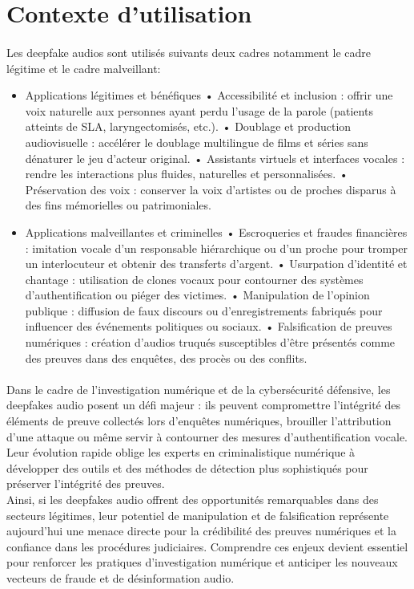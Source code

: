 \documentclass[memoire, 12pt]{report}
\begin{document}
\section{Contexte d’utilisation}

\paragraph{}Les deepfake audios sont utilisés suivants deux cadres notamment le cadre légitime et le cadre malveillant:
\begin{itemize}
    \item Applications légitimes et bénéfiques
	•	Accessibilité et inclusion : offrir une voix naturelle aux personnes ayant perdu l’usage de la parole (patients atteints de SLA, laryngectomisés, etc.).
	•	Doublage et production audiovisuelle : accélérer le doublage multilingue de films et séries sans dénaturer le jeu d’acteur original.
	•	Assistants virtuels et interfaces vocales : rendre les interactions plus fluides, naturelles et personnalisées.
	•	Préservation des voix : conserver la voix d’artistes ou de proches disparus à des fins mémorielles ou patrimoniales.
	\item Applications malveillantes et criminelles
	•	Escroqueries et fraudes financières : imitation vocale d’un responsable hiérarchique ou d’un proche pour tromper un interlocuteur et obtenir des transferts d’argent.
	•	Usurpation d’identité et chantage : utilisation de clones vocaux pour contourner des systèmes d’authentification ou piéger des victimes.
	•	Manipulation de l’opinion publique : diffusion de faux discours ou d’enregistrements fabriqués pour influencer des événements politiques ou sociaux.
	•	Falsification de preuves numériques : création d’audios truqués susceptibles d’être présentés comme des preuves dans des enquêtes, des procès ou des conflits.
\end{itemize}
\paragraph{} Dans le cadre de l’investigation numérique et de la cybersécurité défensive, les deepfakes audio posent un défi majeur : ils peuvent compromettre l'intégrité des éléments de preuve collectés lors d’enquêtes numériques, brouiller l’attribution d’une attaque ou même servir à contourner des mesures d’authentification vocale. Leur évolution rapide oblige les experts en criminalistique numérique à développer des outils et des méthodes de détection plus sophistiqués pour préserver l’intégrité des preuves.\\
Ainsi, si les deepfakes audio offrent des opportunités remarquables dans des secteurs légitimes, leur potentiel de manipulation et de falsification représente aujourd’hui une menace directe pour la crédibilité des preuves numériques et la confiance dans les procédures judiciaires. Comprendre ces enjeux devient essentiel pour renforcer les pratiques d’investigation numérique et anticiper les nouveaux vecteurs de fraude et de désinformation audio.
\end{document}
